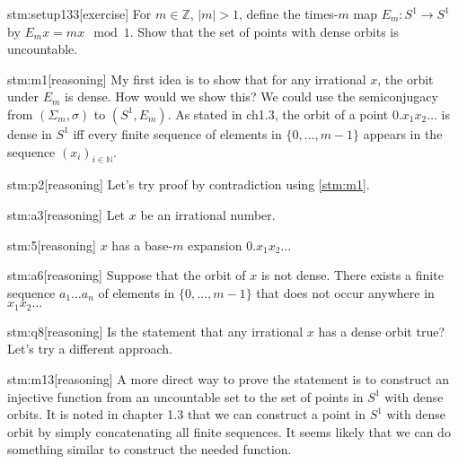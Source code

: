 
\begin{stm}{stm:setup133}[exercise]
For $m \in \mathbb{Z}$, $|m| > 1$, define the times-$m$ map $E_m : S^1 \to S^1$ by $E_m x = mx \mod 1$. Show that the set of points with dense orbits is uncountable.
\end{stm}


\begin{stm}{stm:m1}[reasoning]
My first idea is to show that for any irrational $x$, the orbit under $E_m$ is dense. How would we show this? We could use the semiconjugacy from $(\Sigma_m, \sigma)$ to $(S^1, E_m)$. As stated in ch1.3, the orbit of a point $0.x_1 x_2 \dots$ is dense in $S^1$ iff every finite sequence of elements in $\{0, \dots, m-1\}$ appears in the sequence $(x_i)_{i \in \mathbb{N}}$.
\end{stm}

\begin{stm}{stm:p2}[reasoning]
Let's try proof by contradiction using \ref{stm:m1}.
\end{stm}

\begin{stm}{stm:a3}[reasoning]
Let $x$ be an irrational number.
\end{stm}

\begin{stm}{stm:5}[reasoning]
$x$ has a base-$m$ expansion $0.x_1 x_2 \dots$
\end{stm}

\begin{stm}{stm:a6}[reasoning]
Suppose that the orbit of $x$ is not dense. There exists a finite sequence $a_1 \dots a_n$ of elements in $\{0, \dots, m-1\}$ that does not occur anywhere in $x_1 x_2 \dots$
\end{stm}

\begin{stm}{stm:q8}[reasoning]
Is the statement that any irrational $x$ has a dense orbit true? Let's try a different approach.
\end{stm}

\begin{stm}{stm:m13}[reasoning]
A more direct way to prove the statement is to construct an injective function from an uncountable set to the set of points in $S^1$ with dense orbits. It is noted in chapter 1.3 that we can construct a point in $S^1$ with dense orbit by simply concatenating all finite sequences. It seems likely that we can do something similar to construct the needed function.
\end{stm}

